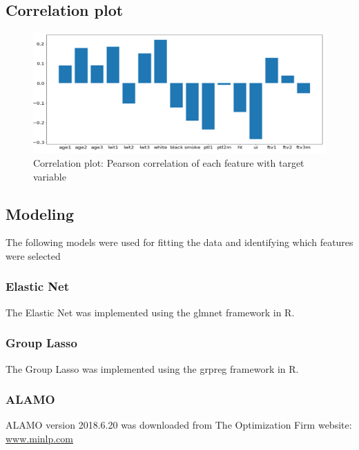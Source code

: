 \documentclass[a4paper,12pt]{article}
\begin{document}
\subsection{Correlation plot}
    \begin{figure}[H]
     \centering
     \includegraphics[scale=0.25]{corr.png}
     \caption{Correlation plot: Pearson correlation of each feature with target variable}
      \label{fig:ALAMO Flowchart}
    \end{figure}

\subsection{Modeling}
    The following models were used for fitting the data and identifying which features were selected
    \subsubsection{Elastic Net}
    The Elastic Net was implemented using the glmnet framework in R.
    \subsubsection{Group Lasso}
    The Group Lasso was implemented using the grpreg framework in R.
    \subsubsection{ALAMO}
    ALAMO version 2018.6.20 was downloaded from The Optimization Firm website: \href{https://minlp.com/alamo}{www.minlp.com}
\end{document}
